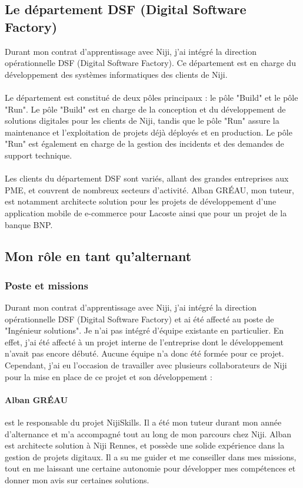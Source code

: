 \documentclass[12pt]{article}
\begin{document}
\subsection{Le département DSF (Digital Software Factory)}
Durant mon contrat d'apprentissage avec Niji, j'ai intégré la direction opérationnelle DSF (Digital Software Factory). Ce département est en charge du développement des systèmes informatiques des clients de Niji.
\\\\
Le département est constitué de deux pôles principaux : le pôle "Build" et le pôle "Run". Le pôle "Build" est en charge de la conception et du développement de solutions digitales pour les clients de Niji, tandis que le pôle "Run" assure la maintenance et l'exploitation de projets déjà déployés et en production. Le pôle "Run" est également en charge de la gestion des incidents et des demandes de support technique.
\\\\
Les clients du département DSF sont variés, allant des grandes entreprises aux PME, et couvrent de nombreux secteurs d'activité. 
Alban GRÉAU, mon tuteur, est notamment architecte solution pour les projets de développement d'une application mobile de e-commerce pour Lacoste ainsi que pour un projet de la banque BNP.
\subsection{Mon rôle en tant qu’alternant}
\subsubsection{Poste et missions}
Durant mon contrat d'apprentissage avec Niji, j'ai intégré la direction opérationnelle DSF (Digital Software Factory) et ai été affecté au poste de "Ingénieur solutions".
Je n'ai pas intégré d'équipe existante en particulier. En effet, j'ai été affecté à un projet interne de l'entreprise dont le développement n'avait pas encore débuté. Aucune équipe n'a donc été formée pour ce projet. Cependant, j'ai eu l'occasion de travailler avec plusieurs collaborateurs de Niji pour la mise en place de ce projet et son développement :
\paragraph{Alban GRÉAU} est le responsable du projet NijiSkills. Il a été mon tuteur durant mon année d'alternance et m'a accompagné tout au long de mon parcours chez Niji. Alban est architecte solution à Niji Rennes, et possède une solide expérience dans la gestion de projets digitaux. Il a su me guider et me conseiller dans mes missions, tout en me laissant une certaine autonomie pour développer mes compétences et donner mon avis sur certaines solutions.
\end{document}
